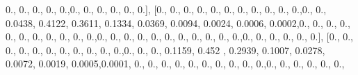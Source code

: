 \documentclass[
]{book}
\newenvironment{Shaded}{\begin{snugshade}}{\end{snugshade}}
\newcommand{\FloatTok}[1]{\textcolor[rgb]{0.00,0.00,0.81}{#1}}
\newcommand{\NormalTok}[1]{#1}
\begin{document}
\begin{Shaded}
\begin{Highlighting}[]
\FloatTok{0.}\NormalTok{, }\FloatTok{0.}\NormalTok{, }\FloatTok{0.}\NormalTok{, }\FloatTok{0.}\NormalTok{, }\FloatTok{0.}\NormalTok{,}\FloatTok{0.}\NormalTok{, }\FloatTok{0.}\NormalTok{, }\FloatTok{0.}\NormalTok{, }\FloatTok{0.}\NormalTok{, }\FloatTok{0.}\NormalTok{, }\FloatTok{0.}\NormalTok{], [}\FloatTok{0.}\NormalTok{, }\FloatTok{0.}\NormalTok{, }\FloatTok{0.}\NormalTok{, }\FloatTok{0.}\NormalTok{, }\FloatTok{0.}\NormalTok{, }\FloatTok{0.}\NormalTok{, }\FloatTok{0.}\NormalTok{, }\FloatTok{0.}\NormalTok{, }\FloatTok{0.}\NormalTok{,}
\FloatTok{0.}\NormalTok{, }\FloatTok{0.}\NormalTok{,}\FloatTok{0.}\NormalTok{, }\FloatTok{0.}\NormalTok{, }\FloatTok{0.0438}\NormalTok{, }\FloatTok{0.4122}\NormalTok{, }\FloatTok{0.3611}\NormalTok{, }\FloatTok{0.1334}\NormalTok{, }\FloatTok{0.0369}\NormalTok{, }\FloatTok{0.0094}\NormalTok{, }\FloatTok{0.0024}\NormalTok{, }\FloatTok{0.0006}\NormalTok{,}
\FloatTok{0.0002}\NormalTok{,}\FloatTok{0.}\NormalTok{, }\FloatTok{0.}\NormalTok{, }\FloatTok{0.}\NormalTok{, }\FloatTok{0.}\NormalTok{, }\FloatTok{0.}\NormalTok{, }\FloatTok{0.}\NormalTok{, }\FloatTok{0.}\NormalTok{, }\FloatTok{0.}\NormalTok{, }\FloatTok{0.}\NormalTok{, }\FloatTok{0.}\NormalTok{, }\FloatTok{0.}\NormalTok{,}\FloatTok{0.}\NormalTok{, }\FloatTok{0.}\NormalTok{, }\FloatTok{0.}\NormalTok{, }\FloatTok{0.}\NormalTok{, }\FloatTok{0.}\NormalTok{, }\FloatTok{0.}\NormalTok{, }\FloatTok{0.}\NormalTok{,}
\FloatTok{0.}\NormalTok{, }\FloatTok{0.}\NormalTok{, }\FloatTok{0.}\NormalTok{, }\FloatTok{0.}\NormalTok{,}\FloatTok{0.}\NormalTok{, }\FloatTok{0.}\NormalTok{, }\FloatTok{0.}\NormalTok{, }\FloatTok{0.}\NormalTok{, }\FloatTok{0.}\NormalTok{, }\FloatTok{0.}\NormalTok{], [}\FloatTok{0.}\NormalTok{, }\FloatTok{0.}\NormalTok{, }\FloatTok{0.}\NormalTok{, }\FloatTok{0.}\NormalTok{, }\FloatTok{0.}\NormalTok{, }\FloatTok{0.}\NormalTok{, }\FloatTok{0.}\NormalTok{, }\FloatTok{0.}\NormalTok{, }\FloatTok{0.}\NormalTok{, }\FloatTok{0.}\NormalTok{,}
\FloatTok{0.}\NormalTok{,}\FloatTok{0.}\NormalTok{, }\FloatTok{0.}\NormalTok{, }\FloatTok{0.}\NormalTok{, }\FloatTok{0.1159}\NormalTok{, }\FloatTok{0.452}\NormalTok{ , }\FloatTok{0.2939}\NormalTok{, }\FloatTok{0.1007}\NormalTok{, }\FloatTok{0.0278}\NormalTok{, }\FloatTok{0.0072}\NormalTok{, }\FloatTok{0.0019}\NormalTok{,}
\FloatTok{0.0005}\NormalTok{,}\FloatTok{0.0001}\NormalTok{, }\FloatTok{0.}\NormalTok{, }\FloatTok{0.}\NormalTok{, }\FloatTok{0.}\NormalTok{, }\FloatTok{0.}\NormalTok{, }\FloatTok{0.}\NormalTok{, }\FloatTok{0.}\NormalTok{, }\FloatTok{0.}\NormalTok{, }\FloatTok{0.}\NormalTok{, }\FloatTok{0.}\NormalTok{, }\FloatTok{0.}\NormalTok{,}\FloatTok{0.}\NormalTok{, }\FloatTok{0.}\NormalTok{, }\FloatTok{0.}\NormalTok{, }\FloatTok{0.}\NormalTok{, }\FloatTok{0.}\NormalTok{, }\FloatTok{0.}\NormalTok{,}

\end{Highlighting}
\end{Shaded}
\end{document}
